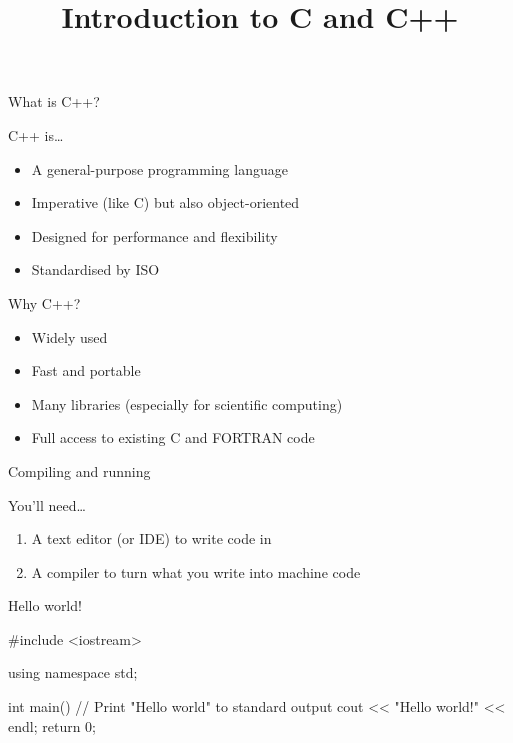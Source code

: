 

\title{Introduction to C and C++}



\maketitle

\begin{frame}{What is C++?}
    \begin{block}{C++ is\ldots}
        \begin{itemize}
            \item A general\hyp{}purpose programming language
            \item Imperative (like C) but also object\hyp{}oriented
            \item Designed for performance and flexibility
            \item Standardised by ISO
        \end{itemize}
    \end{block}
\end{frame}

\begin{frame}{Why C++?}
    \begin{itemize}
        \item Widely used
        \item Fast and portable
        \item Many libraries (especially for scientific computing)
        \item Full access to existing C and FORTRAN code
    \end{itemize}
\end{frame}

\begin{frame}{Compiling and running}
    \begin{block}{You'll need\ldots}
        \begin{enumerate}
            \item A \alert{text editor} (or \alert{IDE}) to write code in
            \item A \alert{compiler} to turn what you write into machine code
        \end{enumerate}
    \end{block}
\end{frame}

\begin{frame}[fragile]{Hello world!}
    \begin{cpp}
        #include <iostream>

        using namespace std;

        int main()
        {
            // Print "Hello world" to standard output
            cout << "Hello world!" << endl;
            return 0;
        }
    \end{cpp}
\end{frame}

